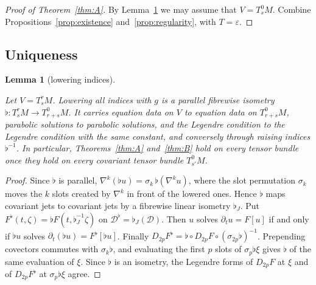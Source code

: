 \documentclass[11pt,reqno]{amsart}
\newtheorem{lemma}[theorem]{Lemma}
\theoremstyle{definition}
\theoremstyle{remark}
\newcommand{\Dom}{\mathcal{D}}
\newcommand{\lean}[1]{}
\newcommand{\uses}[1]{}
\numberwithin{equation}{section}
\begin{document}
\begin{proof}[Proof of Theorem~\ref{thm:A}]
\lean{ShortTime.EquationData.exists_solution_cov, ShortTime.EquationData.exists_solution_cov'}
\uses{prop:existence, prop:regularity, lem:lowering}
By Lemma~\ref{lem:lowering} we may assume that $V=T^0_sM$. Combine
Propositions~\ref{prop:existence} and~\ref{prop:regularity}, with $T=\varepsilon$.
\end{proof}

\subsection{Uniqueness}\label{sec:uniqueness}

\begin{lemma}[lowering indices]\label{lem:lowering}
\lean{ShortTime.solution_unique_of_covariant, ShortTime.flat, ShortTime.fiberInner_flat, ShortTime.slotPerm, ShortTime.fiberInner_slotPerm, ShortTime.flatCc, ShortTime.unitModel_covGrad_flatCc, ShortTime.covJet_flatCc, ShortTime.contMDiffOn_flat_param, ShortTime.contMDiffOn_flatCoord, ShortTime.trivAt_slotPerm, ShortTime.jointlySmoothOn_flatCc, ShortTime.EquationData.flatData, ShortTime.evalFirst_jetFlat, ShortTime.castIdx_prepend_jetFlat, ShortTime.EquationData.flatData_partialDeriv, ShortTime.EquationData.legendreForm_flatData, ShortTime.EquationData.isParabolicAt_flatData, ShortTime.EquationData.isParabolicSolution_flatData, ShortTime.flatCc_injective, ShortTime.exists_solution_of_covariant, ShortTime.contMDiff_flatSymm, ShortTime.sharpCc, ShortTime.flatCc_sharpCc, ShortTime.EquationData.isParabolicSolution_of_flatData, ShortTime.EquationData.isParabolicSolution_flatData_iff}
\uses{def:data, def:solution, def:legendre}
Let $V=T^r_sM$. Lowering all indices with $g$ is a parallel fibrewise isometry
$\flat\colon T^r_sM\to T^0_{r+s}M$. It carries equation data on $V$ to equation data on $T^0_{r+s}M$,
parabolic solutions to parabolic solutions, and the Legendre condition to the Legendre condition with
the same constant, and conversely through raising indices $\flat^{-1}$. In particular,
Theorems~\ref{thm:A} and~\ref{thm:B} hold on every tensor bundle once they hold on every covariant
tensor bundle $T^0_{s'}M$.
\end{lemma}

\begin{proof}
Since $\flat$ is parallel, $\nabla^k(\flat u)=\sigma_k\,\flat(\nabla^ku)$, where the slot permutation
$\sigma_k$ moves the $k$ slots created by $\nabla^k$ in front of the lowered ones. Hence $\flat$ maps
covariant jets to covariant jets by a fibrewise linear isometry $\flat_J$. Put
$F^\flat(t,\zeta)=\flat F(t,\flat_J^{-1}\zeta)$ on $\Dom^\flat=\flat_J(\Dom)$. Then $u$ solves
$\partial_tu=F[u]$ if and only if $\flat u$ solves $\partial_t(\flat u)=F^\flat[\flat u]$. Finally
$D_{2p}F^\flat=\flat\circ D_{2p}F\circ(\sigma_{2p}\flat)^{-1}$. Prepending covectors commutes with
$\sigma_k\flat$, and evaluating the first $p$ slots of $\sigma_p\flat\xi$ gives $\flat$ of the same
evaluation of $\xi$. Since $\flat$ is an isometry, the Legendre forms of $D_{2p}F$ at $\xi$ and of
$D_{2p}F^\flat$ at $\sigma_p\flat\xi$ agree.
\end{proof}
\end{document}
